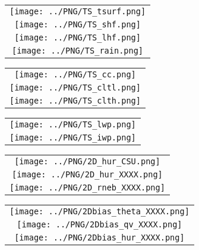 \documentclass{article}
\begin{document}


\begin{table}
  \begin{tabular}{c}
    \texttt{[image: ../PNG/TS\_tsurf.png]} \\
    \texttt{[image: ../PNG/TS\_shf.png]}   \\
    \texttt{[image: ../PNG/TS\_lhf.png]}   \\
    \texttt{[image: ../PNG/TS\_rain.png]}
  \end{tabular}
\end{table}

\clearpage

\begin{table}
  \begin{tabular}{c}
    \texttt{[image: ../PNG/TS\_cc.png]} \\
    \texttt{[image: ../PNG/TS\_cltl.png]}   \\
    \texttt{[image: ../PNG/TS\_clth.png]}
  \end{tabular}
\end{table}

\clearpage

\begin{table}
  \begin{tabular}{c}
    \texttt{[image: ../PNG/TS\_lwp.png]} \\
    \texttt{[image: ../PNG/TS\_iwp.png]} 
  \end{tabular}
\end{table}

\clearpage


\begin{table}
  \begin{tabular}{c}
    \texttt{[image: ../PNG/2D\_hur\_CSU.png]}  \\
    \texttt{[image: ../PNG/2D\_hur\_XXXX.png]} \\
    \texttt{[image: ../PNG/2D\_rneb\_XXXX.png]}	  
  \end{tabular}
\end{table}

\clearpage

\begin{table}
  \begin{tabular}{c}
    \texttt{[image: ../PNG/2Dbias\_theta\_XXXX.png]} \\
    \texttt{[image: ../PNG/2Dbias\_qv\_XXXX.png]}    \\
    \texttt{[image: ../PNG/2Dbias\_hur\_XXXX.png]}
  \end{tabular}
\end{table}
\end{document}
